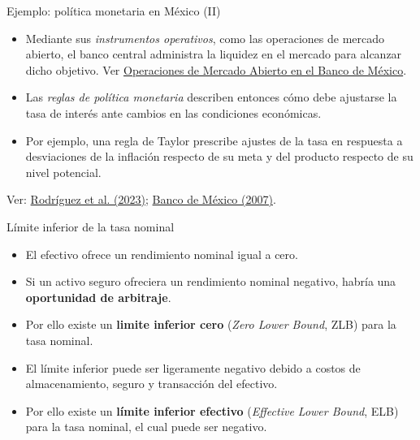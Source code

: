 \documentclass[aspectratio=169,11pt]{beamer}
\begin{document}
\begin{frame}{Ejemplo: política monetaria en México (II)}
  \small
  \begin{itemize}
    \setlength{\itemsep}{0.55em}

    \item Mediante sus \textit{instrumentos operativos}, como las operaciones de mercado abierto, el banco central administra la liquidez en el mercado para alcanzar dicho objetivo. Ver \href{https://www.banxico.org.mx/politica-monetaria/d/\%7BFE14C513-3019-978E-55A7-3112824E905E\%7D.pdf}{Operaciones de Mercado Abierto en el Banco de México}.

    \item Las \textit{reglas de política monetaria} describen entonces cómo debe ajustarse la tasa de interés ante cambios en las condiciones económicas.

    \item Por ejemplo, una regla de Taylor prescribe ajustes de la tasa en respuesta a desviaciones de la inflación respecto de su meta y del producto respecto de su nivel potencial.
  \end{itemize}

  {\footnotesize
  Ver:
  \href{https://www.bis.org/publications/paper-143-central-banking-americas-lessons-two-decades.pdf}
  {Rodríguez et al. (2023)};
  \href{https://www.banxico.org.mx/politica-monetaria/d/\%7BE0B64CFA-4903-B643-978E-AA348BC3C2CD\%7D.pdf}
  {Banco de México (2007)}.
  }
\end{frame}




\begin{frame}{Límite inferior de la tasa nominal}
  \begin{itemize}
    \setlength{\itemsep}{0.6em}
    \item El efectivo ofrece un rendimiento nominal igual a cero.
    \item Si un activo seguro ofreciera un rendimiento nominal negativo, habría una \textbf{oportunidad de arbitraje}.
    \item Por ello existe un \textbf{limite inferior cero} (\textit{Zero Lower Bound}, ZLB) para la tasa nominal.
    \item El límite inferior puede ser ligeramente negativo debido a costos de almacenamiento, seguro y transacción del efectivo.
    \item Por ello existe un \textbf{límite inferior efectivo} (\textit{Effective Lower Bound}, ELB) para la tasa nominal, el cual puede ser negativo.
  \end{itemize}
\end{frame}
\end{document}
